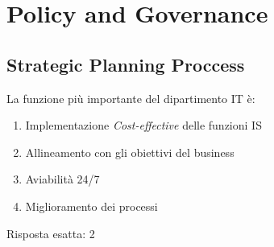 \section{Policy and Governance}
\label{esPG}
\subsection{Strategic Planning Proccess}
\label{esPG:SPP}

\begin{Exercise} [
  title={Quiz},
  label={esPG1}
  ]

  \Question La funzione più importante del dipartimento IT è:
  \begin{enumerate}
   \item Implementazione \textit{Cost-effective} delle funzioni IS
   \item Allineamento con gli obiettivi del business
   \item Aviabilità 24/7
   \item Miglioramento dei processi
  \end{enumerate}
  
\end{Exercise}

\begin{Answer} [
  ref={esPG1},
  number={1}
  ]

  \Question Risposta esatta: 2
\end{Answer}
